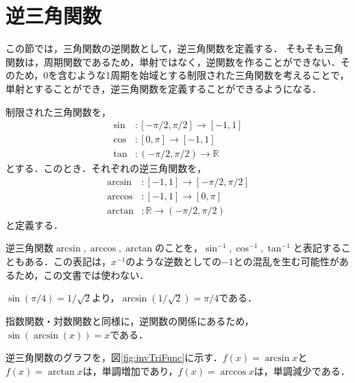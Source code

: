 \clearpage
\section{逆三角関数}
この節では，三角関数の逆関数として，逆三角関数を定義する．
そもそも三角関数は，周期関数であるため，単射ではなく，逆関数を作ることができない．そのため，0を含むような1周期を始域とする制限された三角関数を考えることで，単射とすることができ，逆三角関数を定義することができるようになる．
　
\begin{definition}[逆三角関数]
	制限された三角関数を，
	\begin{align*}
		\sin &: [-\pi/2, \pi/2] \rightarrow [-1, 1] \\
		\cos &: [0, \pi] \rightarrow [-1, 1] \\
		\tan &: (-\pi/2, \pi/2) \rightarrow \mathbb{R}
	\end{align*}
	とする．このとき．それぞれの逆三角関数を，
	\begin{align*}
		\arcsin &: [-1, 1] \rightarrow [-\pi/2, \pi/2] \\
		\arccos &: [-1, 1] \rightarrow [0, \pi] \\
		\arctan &: \mathbb{R} \rightarrow (-\pi/2, \pi/2)
	\end{align*}
	と定義する．
\end{definition}
\begin{rem*}
	逆三角関数$\arcsin, \arccos, \arctan$のことを，$\sin^{-1}, \cos^{-1}, \tan^{-1}$と表記することもある．この表記は，$x^{-1}$のような逆数としての$-1$との混乱を生む可能性があるため，この文書では使わない．
\end{rem*}
\begin{example*}
	$\sin(\pi/4) = 1/\sqrt{2}$より，$\arcsin(1/\sqrt{2}) = \pi/4$である．
\end{example*}
\begin{example*}
	指数関数・対数関数と同様に，逆関数の関係にあるため，$\sin(\arcsin(x)) = x$である．
\end{example*}

逆三角関数のグラフを，図\ref{fig:invTriFunc}に示す．$f(x) = \arcsin x$と$f(x) = \arctan x$は，単調増加であり，$f(x) = \arccos x$は，単調減少である．

